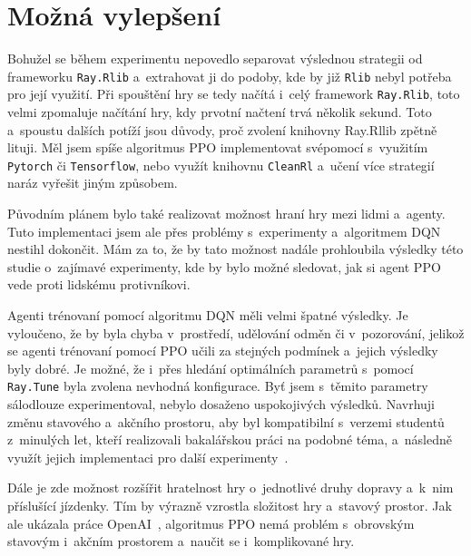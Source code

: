 \section*{Možná vylepšení}
\label{sec:mozna-vylepseni}

Bohužel se během experimentu nepovedlo separovat výslednou strategii od frameworku \texttt{Ray.Rlib} a~extrahovat ji do podoby, kde by již \texttt{Rlib} nebyl potřeba pro její využití.
Při spouštění hry se tedy načítá i~celý framework \texttt{Ray.Rlib}, toto velmi zpomaluje načítání hry, kdy prvotní načtení trvá několik sekund.
Toto a~spoustu dalších potíží jsou důvody, proč zvolení knihovny Ray.Rllib zpětně lituji.
Měl jsem spíše algoritmus PPO implementovat svépomocí s~využitím \texttt{Pytorch} či \texttt{Tensorflow}, nebo využít knihovnu \texttt{CleanRl} a~učení více strategií naráz vyřešit jiným způsobem.

\medskip
Původním plánem bylo také realizovat možnost hraní hry mezi lidmi a~agenty.
Tuto implementaci jsem ale přes problémy s~experimenty a~algoritmem DQN nestihl dokončit.
Mám za to, že by tato možnost nadále prohloubila výsledky této studie o~zajímavé experimenty, kde by bylo možné sledovat, jak si agent PPO vede proti lidskému protivníkovi.

\medskip
Agenti trénovaní pomocí algoritmu DQN měli velmi špatné výsledky.
Je vyloučeno, že by byla chyba v~prostředí, udělování odměn či v~pozorování, jelikož se agenti trénovaní pomocí PPO učili za stejných podmínek a~jejich výsledky byly dobré.
Je možné, že i~přes hledání optimálních parametrů s~pomocí \texttt{Ray.Tune} byla zvolena nevhodná konfigurace.
Byť jsem s~těmito parametry sálodlouze experimentoval, nebylo dosaženo uspokojivých výsledků.
Navrhuji změnu stavového a~akčního prostoru, aby byl kompatibilní s~verzemi studentů z~minulých let, kteří realizovali bakalářskou práci na podobné téma, a~následně využít jejich implementaci pro další experimenty~\cite{Hrklova2023thesis}.

\medskip
Dále je zde možnost rozšířit hratelnost hry o~jednotlivé druhy dopravy a~k~nim příslušící jízdenky.
Tím by výrazně vzrostla složitost hry a~stavový prostor.
Jak ale ukázala práce OpenAI~\cite{Dota2}, algoritmus PPO nemá problém s~obrovským stavovým i~akčním prostorem a~naučit se i~komplikované hry.




%
